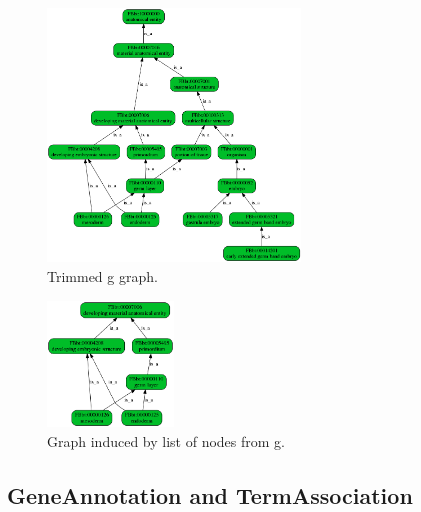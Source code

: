 \documentclass{report}
\begin{document}
\begin{htmlonly}
\label{fig:ontotrimmedgraph}
\end{htmlonly}

\begin{latexonly}
\begin{figure}[htbp]
\centering
\includegraphics[width=0.6\textwidth]{images/trimmed_g.png}
\caption{Trimmed g graph.}
\label{fig:ontotrimmedgraph}
\end{figure}
\end{latexonly}

\begin{htmlonly}
\label{fig:ontoinducedgraph}
\end{htmlonly}

\begin{latexonly}
\begin{figure}[htbp]
\centering
\includegraphics[width=0.3\textwidth]{images/induced_g.png}
\caption{Graph induced by list of nodes from g.}
\label{fig:ontoinducedgraph}
\end{figure}
\end{latexonly}


\subsection{GeneAnnotation and TermAssociation}
\end{document}
